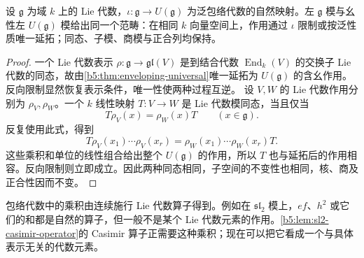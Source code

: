 \begin{theorem}\label{b5:thm:lie-enveloping-modules}
	设 \(\mathfrak g\) 为域 \(k\) 上的 Lie 代数，\(\iota:\mathfrak g\to U(\mathfrak g)\) 为泛包络代数的自然映射。左 \(\mathfrak g\) 模与幺性左 \(U(\mathfrak g)\) 模给出同一个范畴：在相同 \(k\) 向量空间上，作用通过 \(\iota\) 限制或按泛性质唯一延拓；同态、子模、商模与正合列均保持。
\end{theorem}
\begin{proof}
	一个 Lie 代数表示 \(\rho:\mathfrak g\to\mathfrak{gl}(V)\) 是到结合代数 \(\operatorname{End}_k(V)\) 的交换子 Lie 代数的同态，故由\cref{b5:thm:enveloping-universal}唯一延拓为 \(U(\mathfrak g)\) 的含幺作用。反向限制显然恢复表示条件，唯一性使两种过程互逆。 设 \(V,W\) 的 Lie 代数作用分别为 \(\rho_V,\rho_W\)。一个 \(k\) 线性映射 \(T:V\to W\) 是 Lie 代数模同态，当且仅当
	\[
		T\rho_V(x)=\rho_W(x)T\qquad(x\in\mathfrak g).
	\]
	反复使用此式，得到
	\[
		T\rho_V(x_1)\cdots\rho_V(x_r) =\rho_W(x_1)\cdots\rho_W(x_r)T.
	\]
	这些乘积和单位的线性组合给出整个 \(U(\mathfrak g)\) 的作用，所以 \(T\) 也与延拓后的作用相容。反向限制则立即成立。因此两种同态相同，子空间的不变性也相同，核、商及正合性因而不变。
\end{proof}
包络代数中的乘积由连续施行 Lie 代数算子得到。例如在 \(\mathfrak{sl}_2\) 模上，\(ef\)、\(h^2\) 或它们的和都是自然的算子，但一般不是某个 Lie 代数元素的作用。\cref{b5:lem:sl2-casimir-operator}的 Casimir 算子正需要这种乘积；现在可以把它看成一个与具体表示无关的代数元素。

\ProseParagraphBreak

